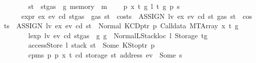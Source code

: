 \begin{isabellebody}
\ \ \ \ \ \ \ {\isachardoublequoteopen}st{\isacharprime}{\kern0pt}\ {\isacharequal}{\kern0pt}\ st{\isasymlparr}gas\ {\isacharcolon}{\kern0pt}{\isacharequal}{\kern0pt}\ g{\isacharprime}{\kern0pt}{\isacharcomma}{\kern0pt}\ memory\ {\isacharcolon}{\kern0pt}{\isacharequal}{\kern0pt}\ m{\isasymrparr}{\isachardoublequoteclose}\isanewline
\ \ {\isacharbar}{\kern0pt}\ {\isacharparenleft}{\kern0pt}{}{\isacharparenright}{\kern0pt}\ p\ x\ t\ g\ l\ t{\isacharprime}{\kern0pt}\ g{\isacharprime}{\kern0pt}\ p{\isacharprime}{\kern0pt}\ s\isanewline
\ \ \ \ \ {\isachardoublequoteopen}expr\ ex\ ev\ cd\ {\isacharparenleft}{\kern0pt}st{\isasymlparr}gas\ {\isacharcolon}{\kern0pt}{\isacharequal}{\kern0pt}\ gas\ st\ {\isacharminus}{\kern0pt}\ costs\ \ {\isacharparenleft}{\kern0pt}ASSIGN\ lv\ ex{\isacharparenright}{\kern0pt}\ ev\ cd\ st{\isasymrparr}{\isacharparenright}{\kern0pt}\ {\isacharparenleft}{\kern0pt}gas\ st\ {\isacharminus}{\kern0pt}\ costs\ \ {\isacharparenleft}{\kern0pt}ASSIGN\ lv\ ex{\isacharparenright}{\kern0pt}\ ev\ cd\ st{\isacharparenright}{\kern0pt}\ {\isacharequal}{\kern0pt}\ Normal\ {\isacharparenleft}{\kern0pt}{\isacharparenleft}{\kern0pt}KCDptr\ p{\isacharcomma}{\kern0pt}\ Calldata\ {\isacharparenleft}{\kern0pt}MTArray\ x\ t{\isacharparenright}{\kern0pt}{\isacharparenright}{\kern0pt}{\isacharcomma}{\kern0pt}\ g{\isacharparenright}{\kern0pt}{\isachardoublequoteclose}\isanewline
\ \ \ \ \ \ \ {\isachardoublequoteopen}lexp\ lv\ ev\ cd\ {\isacharparenleft}{\kern0pt}st{\isasymlparr}gas\ {\isacharcolon}{\kern0pt}{\isacharequal}{\kern0pt}\ g{\isasymrparr}{\isacharparenright}{\kern0pt}\ g\ {\isacharequal}{\kern0pt}\ Normal{\isacharparenleft}{\kern0pt}{\isacharparenleft}{\kern0pt}LStackloc\ l{\isacharcomma}{\kern0pt}\ Storage\ t{\isacharprime}{\kern0pt}{\isacharparenright}{\kern0pt}{\isacharcomma}{\kern0pt}g{\isacharprime}{\kern0pt}{\isacharparenright}{\kern0pt}{\isachardoublequoteclose}\isanewline
\ \ \ \ \ \ \ {\isachardoublequoteopen}accessStore\ l\ {\isacharparenleft}{\kern0pt}stack\ st{\isacharparenright}{\kern0pt}\ {\isacharequal}{\kern0pt}\ Some\ {\isacharparenleft}{\kern0pt}KStoptr\ p{\isacharprime}{\kern0pt}{\isacharparenright}{\kern0pt}{\isachardoublequoteclose}\isanewline
\ \ \ \ \ \ \ {\isachardoublequoteopen}cpm{}s\ p\ p{\isacharprime}{\kern0pt}\ x\ t\ cd\ {\isacharparenleft}{\kern0pt}storage\ st\ {\isacharparenleft}{\kern0pt}address\ ev{\isacharparenright}{\kern0pt}{\isacharparenright}{\kern0pt}\ {\isacharequal}{\kern0pt}\ Some\ s{\isachardoublequoteclose}\isanewline

\end{isabellebody}
